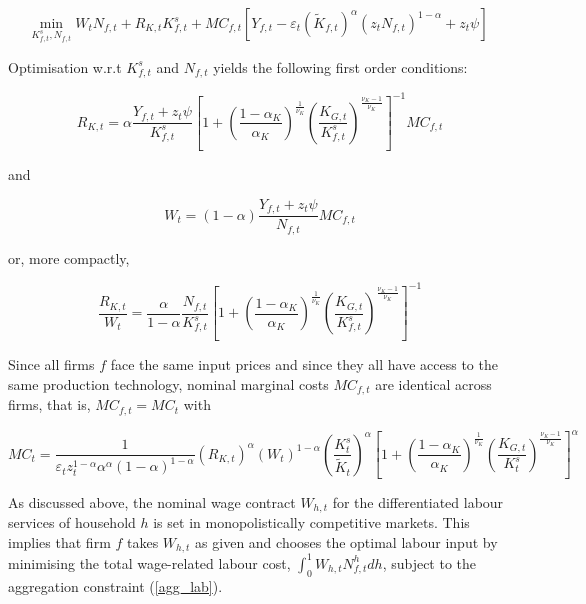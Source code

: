 \documentclass[a4paper,11pt]{article}
\numberwithin{equation}{section}
\begin{document}
	\begin{equation} \label{cost}
	\underset{K^s_{f,t},N_{f,t}}{\text{min}}\; W_tN_{f,t}+R_{K,t}K^s_{f,t}+MC_{f,t}\left[Y_{f,t}-\varepsilon_t\left(\tilde{K}_{f,t}\right)^\alpha\left(z_tN_{f,t}\right)^{1-\alpha}+z_t \psi\right]
	\end{equation}
	
	Optimisation w.r.t $K^s_{f,t}$ and $N_{f,t}$ yields the following first order conditions:
	
	\begin{equation} \label{foc_r}
	R_{K,t}=\alpha\frac{Y_{f,t}+z_t\psi}{K^s_{f,t}}\left[1+\left(\frac{1-\alpha_K}{\alpha_K}\right)^{\frac{1}{\nu_K}}\left(\frac{K_{G,t}}{K^s_{f,t}}\right)^{\frac{\nu_K-1}{\nu_K}}\right]^{-1}MC_{f,t}
	\end{equation}
	
	and
	
	\begin{equation} \label{foc_w}
	W_t=(1-\alpha)\frac{Y_{f,t}+z_t\psi}{N_{f,t}}MC_{f,t}
	\end{equation}
	
	or, more compactly,
	
	\begin{equation} \label{comb_foc}
	\frac{R_{K,t}}{W_t}=\frac{\alpha}{1-\alpha}\frac{N_{f,t}}{K^s_{f,t}}\left[1+\left(\frac{1-\alpha_K}{\alpha_K}\right)^{\frac{1}{\nu_K}}\left(\frac{K_{G,t}}{K^s_{f,t}}\right)^{\frac{\nu_K-1}{\nu_K}}\right]^{-1}
	\end{equation}
	
	Since all firms $f$ face the same input prices and since they all have access to the same production technology, nominal marginal costs $MC_{f,t}$ are identical across firms, that is, $MC_{f,t}=MC_t$ with
	
	\begin{equation} \label{mc}
	MC_t=\frac{1}{\varepsilon_tz^{1-\alpha}_t\alpha^{\alpha}(1-\alpha)^{1-\alpha}}\left(R_{K,t}\right)^{\alpha}\left(W_t\right)^{1-\alpha}\left(\frac{K^s_t}{\tilde{K}_t}\right)^{\alpha}\left[1+\left(\frac{1-\alpha_K}{\alpha_K}\right)^{\frac{1}{\nu_K}}\left(\frac{K_{G,t}}{K^s_t}\right)^{\frac{\nu_K-1}{\nu_K}}\right]^{\alpha}
	\end{equation}
	
	As discussed above, the nominal wage contract $W_{h,t}$ for the differentiated labour services of household $h$ is set in monopolistically competitive markets. This implies that firm $f$ takes $W_{h,t}$ as given and chooses the optimal labour input by minimising the total wage-related labour cost, $\int_{0}^{1}W_{h,t}N^h_{f,t}dh$, subject to the aggregation constraint (\ref{agg_lab}).
	
\end{document}
